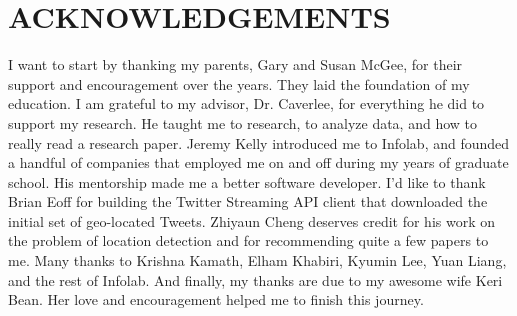 %
%
%


\chapter*{ACKNOWLEDGEMENTS}

I want to start by thanking my parents, Gary and Susan McGee, for their
support and encouragement over the years.
%
They laid the foundation of my education.
%
I am grateful to my advisor, Dr. Caverlee, for everything he did to support my
research.
%
He taught me to research, to analyze data, and how to really read a research
paper.
%
Jeremy Kelly introduced me to Infolab, and founded a handful of companies
that employed me on and off during my years of graduate school.
%
His mentorship made me a better software developer.
%
I'd like to thank Brian Eoff for building the Twitter Streaming API client that
downloaded the initial set of geo-located Tweets.
%
Zhiyaun Cheng deserves credit for his work on the problem of location detection
and for recommending quite a few papers to me.
%
Many thanks to Krishna Kamath, Elham Khabiri, Kyumin Lee, Yuan Liang, and the
rest of Infolab.
%
And finally, my thanks are due to my awesome wife Keri Bean.
%
Her love and encouragement helped me to finish this journey.
\pagebreak{}
